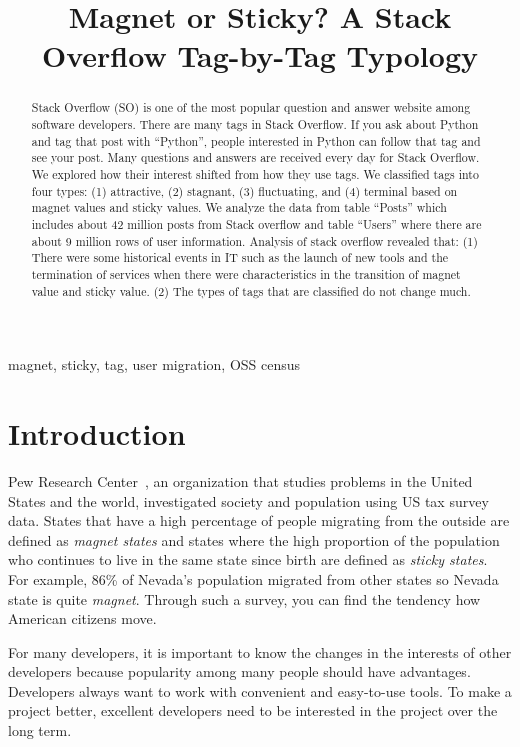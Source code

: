 \documentclass[conference]{IEEEtran}
\begin{document}
\title{Magnet or Sticky? A Stack Overflow Tag-by-Tag Typology\\
}

\maketitle

\begin{abstract}
Stack Overflow (SO) is one of the most popular question and answer website among software developers. There are many tags in Stack Overflow.  If you ask about Python and tag that post with ``Python'', people interested in Python can follow that tag and see your post. Many questions and answers are received every day for Stack Overflow. We explored how their interest shifted from how they use tags. We classified tags into four types: (1) attractive, (2) stagnant, (3) fluctuating, and (4) terminal based on magnet values and sticky values. We analyze the data from table ``Posts'' which includes about 42 million posts from Stack overflow and table ``Users'' where there are about 9 million rows of user information. Analysis of stack overflow revealed that: 
(1) There were some historical events in IT  such as the launch of new tools and the termination of services when there were characteristics in the transition of magnet value and sticky value.
(2) The types of tags that are classified do not change much.
\end{abstract}

\begin{IEEEkeywords}
magnet, sticky, tag, user migration, OSS census
\end{IEEEkeywords}

\section{Introduction}
Pew Research Center~\cite{communityeconomic}, an organization that studies problems in the United States and the world, investigated society and population using US tax survey data.  States that have a high percentage of people migrating from the outside are defined as \emph{magnet states} and states where the high proportion of the population who continues to live in the same state since birth are defined as \emph{sticky states}. For example, 86\% of Nevada's population migrated from other states so Nevada state is quite \emph{magnet}. Through such a survey, you can find the tendency how American citizens move.

\smallskip
For many developers, it is important to know the changes in the interests of other developers because popularity among many people should have advantages. Developers always want to work with convenient and easy-to-use tools. To make a project better, excellent developers need to be interested in the project over the long term.\\
\end{document}
